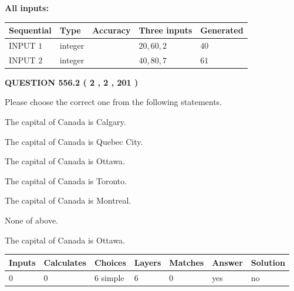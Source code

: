 \documentclass[12pt]{article}
\begin{document}
   
   
   
\noindent\vspace{0.1in}\hspace{-0.08in} {\textbf{\Large{All inputs: }}}
   
   
  
  
\noindent\begin{tabular}{|l|l|l|l|l|}
\hline
 Sequential & Type & Accuracy & Three inputs & Generated \\ 
\hline
 
 
  INPUT $  1 $ & integer &  & $
 20
 , 
 60
 , 
 2
 $ & $ 40 $ 
 \\  \hline  
 
 
  INPUT $  2 $ & integer &  & $
 40
 , 
 80
 , 
 7
 $ & $ 61 $ 
 \\  \hline  
 \end{tabular}
   
   
  
\vspace{0.2in}
  
{\textbf{\Large{QUESTION
556.2 
 ( 2 , 2 , 201 )
}}}
  
  
Please choose the correct one from the following statements.
 
 
The capital of Canada is Calgary.
 
 
The capital of Canada is Quebec City.
 
 
The capital of Canada is Ottawa.
 
 
The capital of Canada is Toronto.
 
 
The capital of Canada is Montreal.
 
 
 None of above.
 
 
\noindent{}
 
 
The capital of Canada is Ottawa.
 
 
\noindent{}
 
 
   
   
   
   
\noindent\begin{tabular}{|l|l|l|l|l|l|l|}
 \hline
Inputs & Calculates & Choices & Layers & Matches & Answer & Solution \\ \hline
 0  & 
 0  & 
 6
  simple  
  & 
 6  & 
 0  & 
  yes & 
  no 
  \\ \hline
 \end{tabular}
   
\end{document}
